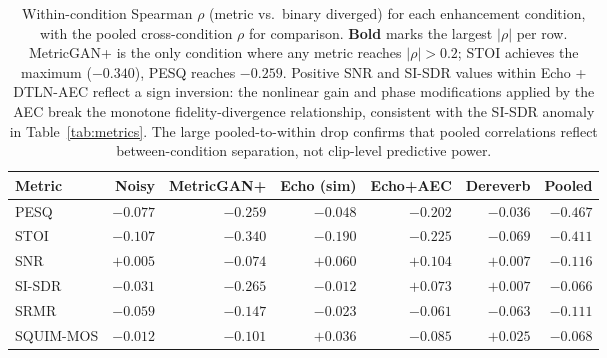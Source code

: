 \begin{table}[!t]
  \centering
  \begin{tabular}{lrrrrr|r}
    \hline
    \textbf{Metric} & \textbf{Noisy} & \textbf{MetricGAN+} & \textbf{Echo (sim)} & \textbf{Echo+AEC} & \textbf{Dereverb} & \textbf{Pooled} \\
    \hline
    PESQ      & $-0.077$ & $\mathbf{-0.259}$ & $-0.048$ & $-0.202$ & $-0.036$ & $-0.467$ \\
    STOI      & $-0.107$ & $\mathbf{-0.340}$ & $-0.190$ & $-0.225$ & $-0.069$ & $-0.411$ \\
    SNR       & $+0.005$ & $-0.074$ & $+0.060$ & $\mathbf{+0.104}$ & $+0.007$ & $-0.116$ \\
    SI-SDR    & $-0.031$ & $\mathbf{-0.265}$ & $-0.012$ & $+0.073$ & $+0.007$ & $-0.066$ \\
    SRMR      & $-0.059$ & $\mathbf{-0.147}$ & $-0.023$ & $-0.061$ & $-0.063$ & $-0.111$ \\
    SQUIM-MOS & $-0.012$ & $\mathbf{-0.101}$ & $+0.036$ & $-0.085$ & $+0.025$ & $-0.068$ \\
    \hline
  \end{tabular}
  \caption{Within-condition Spearman $\rho$ (metric vs.\ binary diverged) for each
    enhancement condition, with the pooled cross-condition $\rho$ for comparison.
    \textbf{Bold} marks the largest $|\rho|$ per row.
    MetricGAN{+} is the only condition where any metric reaches $|\rho|>0.2$;
    STOI achieves the maximum ($-0.340$), PESQ reaches $-0.259$.
    Positive SNR and SI-SDR values within Echo + DTLN-AEC reflect a sign
    inversion: the nonlinear gain and phase modifications applied by the AEC
    break the monotone fidelity-divergence relationship, consistent with the
    SI-SDR anomaly in Table~\ref{tab:metrics}.
    The large pooled-to-within drop confirms that pooled correlations reflect
    between-condition separation, not clip-level predictive power.}
  \label{tab:within_corr}
\end{table}
